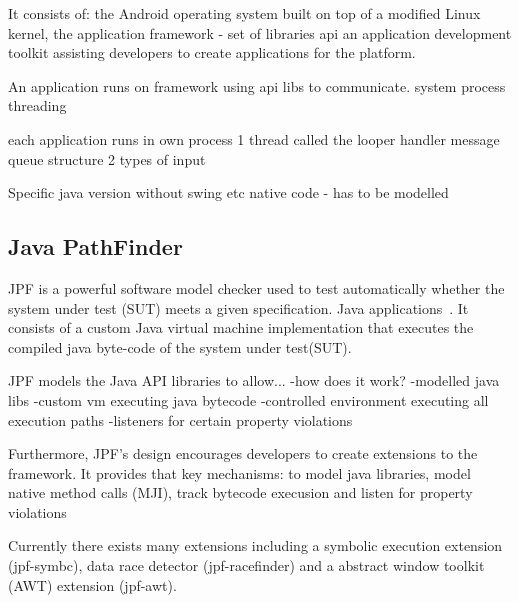 \documentclass{acm_proc_article-sp}
\begin{document}
It consists of:
    the Android operating system built on top of a modified Linux kernel,
    the application framework - set of libraries api
    an application development toolkit assisting developers to create applications for the platform.

    
An application runs on framework using api libs to communicate.
system process threading


each application runs in own process
1 thread called the looper
handler message queue structure
2 types of input



Specific java version without swing etc
native code - has to be modelled


\subsection{Java PathFinder}
JPF is a powerful software model checker used to test automatically whether the system under test (SUT) meets a given specification.
Java applications~\cite{}. It consists of a custom Java virtual machine implementation that executes the compiled java byte-code of the
system under test(SUT).


JPF models the Java API libraries to allow... 
-how does it work?
-modelled java libs
-custom vm executing java bytecode
-controlled environment executing all execution paths
-listeners for certain property violations 

Furthermore, JPF's design encourages developers to create extensions to the framework. It provides that key mechanisms:
to model java libraries,
model native method calls (MJI),
track bytecode execusion and listen for property violations


Currently there exists many extensions including a symbolic execution extension (jpf-symbc), data race detector (jpf-racefinder) and a
abstract window toolkit (AWT) extension (jpf-awt).
\end{document}
